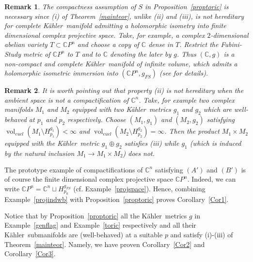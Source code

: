 \documentclass[12pt]{amsart}
\newcommand{\C}{\mathbb{C}}
\newcommand{\K}{K\"{a}hler}
\newcommand{\vol}{{\operatorname{vol}}}
\newtheorem{remark}{Remark}
\begin{document}
\begin{remark}\label{RmkEsempioCinCPn}\rm
	The compactness assumption of $S$ in Proposition~\ref{proptoric} is necessary since (i) of Theorem~\ref{mainteor}, unlike (ii) and (iii), is not hereditary for complete \K\ manifold
	admitting a holomorphic isometry into
	finite dimensional complex projective space. 
	Take, for example, a complex $2$-dimensional abelian variety $T\subset \C P^n$ and choose a copy of $	\C$ dense in $T$. Restrict the Fubini-Study metric of  $\C P^n$
	to $T$ and to  $\C$ denoting the later by  $g$. Thus $(\C, g)$ is a non-compact  and complete
	\K\  manifold of infinite volume,  which admits a holomorphic isometric immersion into $(\C P^n, g_{FS})$ (see \cite[Example 6.4, p. 18]{LoiPlaciniZedda23SasakiHomogeneous} for details).
\end{remark}


\begin{remark}\rm
	It is worth pointing out that property
	(ii) is not  hereditary when the ambient space is not a compactification of $\C^n$.
	Take, for example two complex manifolds $M_1$ and $M_2$ equipped with two \K\ metrics $g_1$ and $g_2$ which are well-behaved at $p_1$ and $p_2$ respectively. Choose $(M_1,g_1)$ and $(M_2,g_2)$ satisfying $\vol_{eucl}(M_1\setminus H_{p_1}^{g_1})<\infty$ and $\vol_{eucl}(M_2\setminus H_{p_2}^{g_2})=\infty$.
	Then the product $M_1\times M_2$ equipped with the \K\ metric $g_1\oplus g_2$  satisfies (iii) while  $g_1$ (which is induced by the natural inclusion $M_1\rightarrow M_1\times M_2$)  does not.
\end{remark}


The prototype example of compactifications of $\C^n$ satisfying 
$(A')$ and $(B')$ is  of course 
the finite dimensional complex projective space $\C P^n$.
Indeed, we can write $\C P^n=\C^n\sqcup H^{g_{FS}}_{p_0}$ (cf. Example~\ref{projspace}). 
Hence, combining Example~\ref{projindwb} with  Proposition~\ref{proptoric} proves Corollary~\ref{Cor1}.






Notice that by Proposition~\ref{proptoric}  all   the \K\ metrics $g$ in Example~\ref{genflag} and Example~\ref{toric} respectively  and all their \K\ submanifolds are (well-behaved) at a suitable $p$ and satisfy (i)-(iii)
of Theorem~\ref{mainteor}. Namely, we have proven Corollary~\ref{Cor2} and Corollary~\ref{Cor3}.
\end{document}

